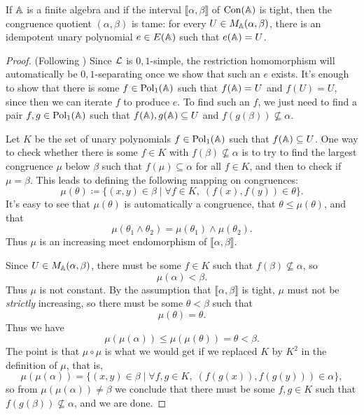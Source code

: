\begin{appendices}
\begin{thm}\label{thm-tight-tame} If $\mathbb{A}$ is a finite algebra and if the interval $\llbracket \alpha, \beta \rrbracket$ of $\operatorname{Con}(\mathbb{A})$ is tight, then the congruence quotient $(\alpha, \beta)$ is tame: for every $U \in M_{\mathbb{A}}(\alpha, \beta)$, there is an idempotent unary polynomial $e \in E(\mathbb{A})$ such that $e(\mathbb{A}) = U$.
\end{thm}
\begin{proof} (Following \cite{hobby-mckenzie}) Since $\mathcal{L}$ is $0,1$-simple, the restriction homomorphism will automatically be $0,1$-separating once we show that such an $e$ exists. It's enough to show that there is some $f \in \operatorname{Pol}_1(\mathbb{A})$ such that $f(\mathbb{A}) = U$ and $f(U) = U$, since then we can iterate $f$ to produce $e$. To find such an $f$, we just need to find a pair $f,g \in \operatorname{Pol}_1(\mathbb{A})$ such that $f(\mathbb{A}), g(\mathbb{A}) \subseteq U$ and $f(g(\beta)) \not\subseteq \alpha$.

Let $K$ be the set of unary polynomials $f \in \operatorname{Pol}_1(\mathbb{A})$ such that $f(\mathbb{A}) \subseteq U$. One way to check whether there is some $f \in K$ with $f(\beta) \not\subseteq \alpha$ is to try to find the largest congruence $\mu$ below $\beta$ such that $f(\mu) \subseteq \alpha$ for all $f \in K$, and then to check if $\mu = \beta$. This leads to defining the following mapping on congruences:
\[
\mu(\theta) \coloneqq \{(x,y) \in \beta \mid \forall f \in K,\; (f(x), f(y)) \in \theta\}.
\]
It's easy to see that $\mu(\theta)$ is automatically a congruence, that $\theta \le \mu(\theta)$, and that
\[
\mu(\theta_1 \wedge \theta_2) = \mu(\theta_1) \wedge \mu(\theta_2).
\]
Thus $\mu$ is an increasing meet endomorphism of $\llbracket\alpha, \beta\rrbracket$.

Since $U \in M_{\mathbb{A}}(\alpha,\beta)$, there must be some $f \in K$ such that $f(\beta) \not\subseteq \alpha$, so
\[
\mu(\alpha) < \beta.
\]
Thus $\mu$ is not constant. By the assumption that $\llbracket \alpha, \beta \rrbracket$ is tight, $\mu$ must not be \emph{strictly} increasing, so there must be some $\theta < \beta$ such that
\[
\mu(\theta) = \theta.
\]
Thus we have
\[
\mu(\mu(\alpha)) \le \mu(\mu(\theta)) = \theta < \beta.
\]
The point is that $\mu\circ \mu$ is what we would get if we replaced $K$ by $K^2$ in the definition of $\mu$, that is,
\[
\mu(\mu(\alpha)) = \{(x,y) \in \beta \mid \forall f, g \in K,\; (f(g(x)), f(g(y))) \in \alpha\},
\]
so from $\mu(\mu(\alpha)) \ne \beta$ we conclude that there must be some $f,g \in K$ such that $f(g(\beta)) \not\subseteq \alpha$, and we are done.
\end{proof}


\end{appendices}
